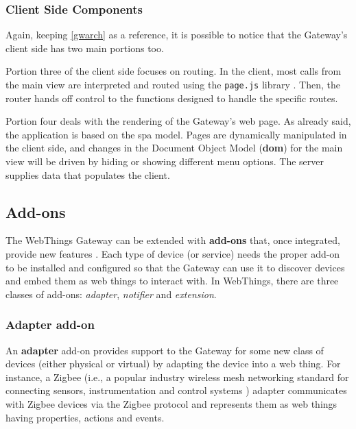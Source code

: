 \subsubsection{Client Side Components}
Again, keeping \autoref{gwarch} as a reference, it is possible to notice that the Gateway's client side has two main portions too.

Portion three of the client side focuses on routing. In the client, most calls from the main view are interpreted and routed using the \texttt{page.js} library \cite{pagejsgithub}. Then, the router hands off control to the functions designed to handle the specific routes. 

Portion four deals with the rendering of the Gateway's web page.
As already said, the application is based on the \gls{spa} model. Pages are dynamically manipulated in the client side, and changes in the Document Object Model (\textbf{\gls{dom}}) for the main view will be driven by hiding or showing different menu options.
The server supplies data that populates the client.


\subsection{Add-ons}

The WebThings Gateway can be extended with \textbf{add-ons} that, once integrated, provide new features \cite{wtaddonsabout}. Each type of device (or service) needs the proper add-on to be installed and configured so that the Gateway can use it to discover devices and embed them as \glspl{web thing} to interact with.
In WebThings, there are three classes of add-ons: \textit{adapter}, \textit{notifier} and \textit{extension}.

\subsubsection{Adapter add-on}
\label{adapter}

An \textbf{adapter} add-on provides support to the Gateway for some new class of devices (either physical or virtual) by adapting the device into a \gls{web thing}. For instance, a Zigbee \cite{iotzigbee} (i.e., a popular industry wireless mesh networking standard for connecting sensors, instrumentation and control systems \cite{wright2009killerbee}) adapter communicates with Zigbee devices via the Zigbee protocol and represents them as \glspl{web thing} having properties, actions and events.

